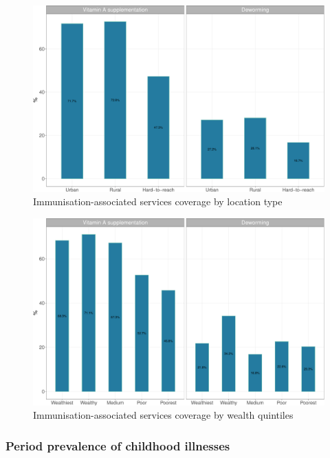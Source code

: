 \documentclass[12pt,a4paper]{article}
\begin{document}
\begin{figure}[H]

{\centering \includegraphics{kayahReport_files/figure-latex/epi5plot-1} 

}

\caption{Immunisation-associated services coverage by location type}\label{fig:epi5plot}
\end{figure}

\begin{figure}[H]

{\centering \includegraphics{kayahReport_files/figure-latex/epi6plot-1} 

}

\caption{Immunisation-associated services coverage by wealth quintiles}\label{fig:epi6plot}
\end{figure}

\hypertarget{illness}{%
\subsubsection{Period prevalence of childhood illnesses}\label{illness}}
\end{document}
